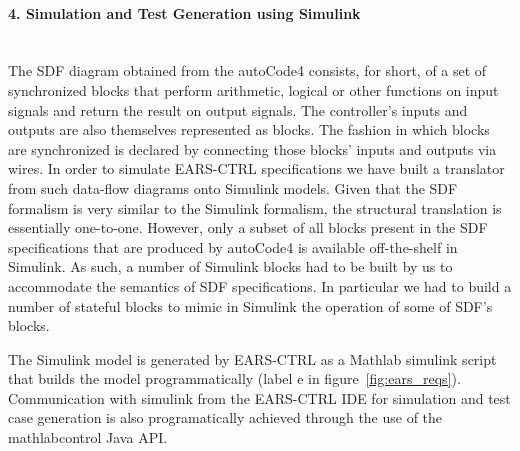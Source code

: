 \paragraph{4. Simulation and Test Generation using Simulink\\\\}

The SDF diagram obtained from the \textsf{autoCode4}
consists, for short, of a set of synchronized blocks that perform arithmetic,
logical or other functions on input signals and return the result on output signals. The controller's inputs and
outputs are also themselves represented as blocks. The fashion in which blocks
are synchronized is declared by connecting those blocks' inputs and outputs via
wires. In order to simulate \textsf{EARS-CTRL} specifications we have built a
translator from such data-flow diagrams onto Simulink models. Given that the SDF
formalism is very similar to the Simulink formalism, the structural translation
is essentially one-to-one. However, only a subset of all blocks present in
the SDF specifications that are produced by \textsf{autoCode4} is available
off-the-shelf in Simulink. As such, a number of Simulink blocks had to be built
by us to accommodate the semantics of SDF specifications. In
particular we had to build a number of stateful blocks to mimic in Simulink the
operation of some of SDF's blocks.

The Simulink model is generated by \textsf{EARS-CTRL} as a Mathlab simulink
script that builds the model programmatically (label \textsf{e} in
figure~\ref{fig:ears_reqs}). Communication with simulink from the \textsf{EARS-CTRL} IDE for
simulation and test case generation is also programatically achieved through the
use of the \textsf{mathlabcontrol}\cite{mathlabcontrol} Java API.
